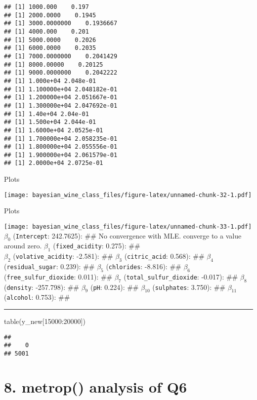 \documentclass[
]{article}
\newenvironment{Shaded}{\begin{snugshade}}{\end{snugshade}}
\newcommand{\DecValTok}[1]{\textcolor[rgb]{0.00,0.00,0.81}{#1}}
\newcommand{\FunctionTok}[1]{\textcolor[rgb]{0.00,0.00,0.00}{#1}}
\newcommand{\NormalTok}[1]{#1}
\newcommand{\SpecialCharTok}[1]{\textcolor[rgb]{0.00,0.00,0.00}{#1}}
\begin{document}
\begin{verbatim}
## [1] 1000.000    0.197
## [1] 2000.0000    0.1945
## [1] 3000.0000000    0.1936667
## [1] 4000.000    0.201
## [1] 5000.0000    0.2026
## [1] 6000.0000    0.2035
## [1] 7000.0000000    0.2041429
## [1] 8000.00000    0.20125
## [1] 9000.0000000    0.2042222
## [1] 1.000e+04 2.048e-01
## [1] 1.100000e+04 2.048182e-01
## [1] 1.200000e+04 2.051667e-01
## [1] 1.300000e+04 2.047692e-01
## [1] 1.40e+04 2.04e-01
## [1] 1.500e+04 2.044e-01
## [1] 1.6000e+04 2.0525e-01
## [1] 1.700000e+04 2.058235e-01
## [1] 1.800000e+04 2.055556e-01
## [1] 1.900000e+04 2.061579e-01
## [1] 2.0000e+04 2.0725e-01
\end{verbatim}

Plots

\texttt{[image: bayesian\_wine\_class\_files/figure-latex/unnamed-chunk-32-1.pdf]}

Plots

\texttt{[image: bayesian\_wine\_class\_files/figure-latex/unnamed-chunk-33-1.pdf]}
\(\beta_0\) (\texttt{Intercept}: 242.7625): \#\# No convergence with
MLE. converge to a value around zero. \(\beta_1\)
(\texttt{fixed\_acidity}: 0.275): \#\#\\
\(\beta_2\) (\texttt{volative\_acidity}: -2.581): \#\# \(\beta_3\)
(\texttt{citric\_acid}: 0.568): \#\# \(\beta_4\)
(\texttt{residual\_sugar}: 0.239): \#\# \(\beta_5\) (\texttt{chlorides}:
-8.816): \#\# \(\beta_6\) (\texttt{free\_sulfur\_dioxide}: 0.011): \#\#
\(\beta_7\) (\texttt{total\_sulfur\_dioxide}: -0.017): \#\# \(\beta_8\)
(\texttt{density}: -257.798): \#\# \(\beta_9\) (\texttt{pH}: 0.224):
\#\# \(\beta_{10}\) (\texttt{sulphates}: 3.750): \#\# \(\beta_{11}\)
(\texttt{alcohol}: 0.753): \#\#

\begin{center}\rule{0.5\linewidth}{0.5pt}\end{center}

\begin{Shaded}
\begin{Highlighting}[]
\FunctionTok{table}\NormalTok{(y\_new[}\DecValTok{15000}\SpecialCharTok{:}\DecValTok{20000}\NormalTok{])}
\end{Highlighting}
\end{Shaded}

\begin{verbatim}
## 
##    0 
## 5001
\end{verbatim}

\hypertarget{metrop-analysis-of-q6}{%
\section{8. metrop() analysis of Q6}\label{metrop-analysis-of-q6}}
\end{document}
